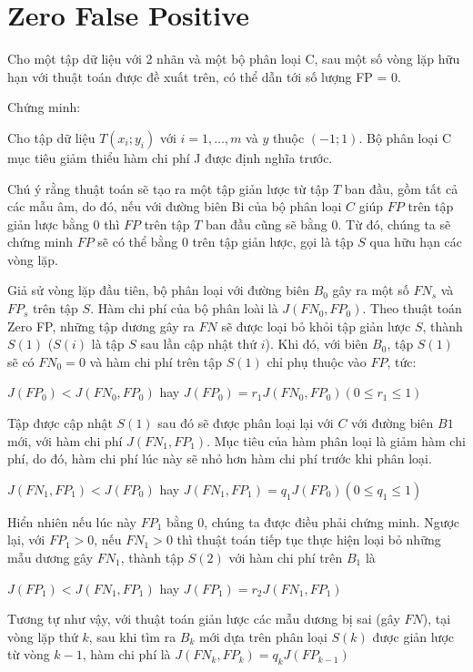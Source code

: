 \documentclass[./../main.tex]{subfiles}
\begin{document}
\section{Zero False Positive}
Cho một tập dữ liệu với 2 nhãn và một bộ phân loại C, sau một số vòng lặp hữu hạn với thuật toán được đề xuất trên, có thể dẫn tới số lượng FP = 0.

Chứng minh:

Cho tập dữ liệu $T (x_i;y_i)$ với $i=1,\ldots,m$ và $y$ thuộc $(-1;1)$. Bộ phân loại C mục tiêu giảm thiểu hàm chi phí J được định nghĩa trước.


Chú ý rằng thuật toán sẽ tạo ra một tập giản lược từ tập $T$ ban đầu, gồm tất cả các mẫu âm, do đó, nếu với đường biên Bi của bộ phân loại $C$ giúp $FP$ trên tập giản lược bằng 0 thì $FP$ trên tập $T$ ban đầu cũng sẽ bằng 0. Từ đó, chúng ta sẽ chứng minh $FP$ sẽ có thể bằng $0$ trên tập giản lược, gọi là tập $S$ qua hữu hạn các vòng lặp.


Giả sử vòng lặp đầu tiên, bộ phân loại với đường biên $B_0$ gây ra một số $FN_s$ và $FP_s$ trên tập $S$. Hàm chi phí của bộ phân loài là $J(FN_0,FP_0)$. Theo thuật toán Zero FP, những tập dương gây ra $FN $ sẽ được loại bỏ khỏi tập giản lược $S$, thành $S(1)$ ($S(i)$ là tập $S$ sau lần cập nhật thứ $i$). Khi đó, với biên $B_0$, tập $S(1)$ sẽ có $FN_0 = 0$ và hàm chi phí trên tập $S(1)$ chỉ phụ thuộc vào $FP$, tức:

$J(FP_0) < J(FN_0, FP_0)$ hay $J(FP_0) = r_1 J(FN_0, FP_0) ( 0 \leq r_1 \leq 1)$

Tập được cập nhật $S(1)$ sau đó sẽ được phân loại lại với $C$ với đường biên $B1$ mới, với hàm chi phí $J(FN_1, FP_1)$. Mục tiêu của hàm phân loại là giảm hàm chi phí, do đó, hàm chi phí lúc này sẽ nhỏ hơn hàm chi phí trước khi phân loại.


$J(FN_1, FP_1) < J(FP_0)$ hay $J(FN_1, FP_1) = q_1 J(FP_0) (0 \leq q_1 \leq 1)$

Hiển nhiên nếu lúc này $FP_1$ bằng 0, chúng ta được điều phải chứng minh. Ngược lại, với $FP_1 >0$, nếu $FN_1 > 0$ thì thuật toán tiếp tục thực hiện loại bỏ những mẫu dương gây $FN_1$, thành tập $S(2)$ với hàm chi phí trên $B_1$ là


$J(FP_1) < J(FN_1, FP_1)$ hay $J(FP_1) = r_2 J(FN_1,FP_1)$

Tương tự như vậy, với thuật toán giản lược các mẫu dương bị sai (gây $FN$), tại vòng lặp thứ $k$, sau khi tìm ra $B_k$ mới dựa trên phân loại $S(k)$ được giản lược từ vòng $k-1$, hàm chi phí là $J(FN_k, FP_k) = q_k J(FP_{k-1})$
\end{document}
